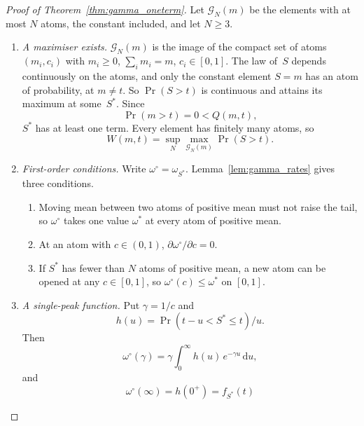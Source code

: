 \documentclass[11pt,a4paper]{article}
\theoremstyle{plain}
\theoremstyle{definition}
\theoremstyle{remark}
\begin{document}
\label{prf:thm:gamma_oneterm}
\begin{proof}[Proof of Theorem~\ref{thm:gamma_oneterm}]
Let $\mathcal{G}_N(m)$ be the elements with at most $N$ atoms, the constant included, and let $N \ge 3$.
\begin{enumerate}
  \item \emph{A maximiser exists.} $\mathcal{G}_N(m)$ is the image of the compact set of atoms $(m_i, c_i)$ with $m_i \ge 0$, $\sum_i m_i = m$, $c_i \in [0, 1]$.
    The law of~$S$ depends continuously on the atoms, and only the constant element $S = m$ has an atom of probability, at $m \ne t$.
    So $\Pr(S > t)$ is continuous and attains its maximum at some~$S^*$.
    Since
    \begin{equation}
      \Pr(m > t) = 0 < Q(m, t),
    \end{equation}
    $S^*$ has at least one term.
    Every element has finitely many atoms, so
    \begin{equation}
      W(m, t) = \sup_N \max_{\mathcal{G}_N(m)} \Pr(S > t).
    \end{equation}
  \item \emph{First-order conditions.} Write $\omega^\circ = \omega_{S^*}$.
    Lemma~\ref{lem:gamma_rates} gives three conditions.
    \begin{enumerate}[label=(\roman*)]
      \item Moving mean between two atoms of positive mean must not raise the tail, so $\omega^\circ$ takes one value $\omega^*$ at every atom of positive mean.
      \item At an atom with $c \in (0, 1)$, $\partial\omega^\circ/\partial c = 0$.
      \item If $S^*$ has fewer than $N$ atoms of positive mean, a new atom can be opened at any $c \in [0, 1]$, so $\omega^\circ(c) \le \omega^*$ on $[0, 1]$.
    \end{enumerate}
  \item \emph{A single-peak function.} Put $\gamma = 1/c$ and
    \begin{equation}
      h(u) = \Pr(t - u < S^* \le t)/u.
    \end{equation}
    Then
    \begin{equation}
      \omega^\circ(\gamma) = \gamma\int_0^\infty h(u)\, e^{-\gamma u}\, \mathrm{d}u,
    \end{equation}
    and
    \begin{equation}
      \omega^\circ(\infty) = h(0^+) = f_{S^*}(t)
    \end{equation}

\end{enumerate}
\end{proof}
\end{document}
